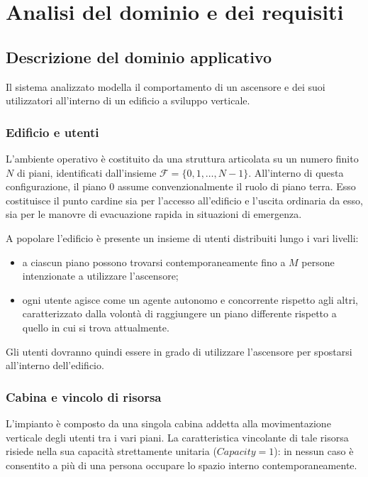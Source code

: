 \chapter{Analisi del dominio e dei requisiti}

%
%
\section{Descrizione del dominio applicativo}
Il sistema analizzato modella il comportamento di un ascensore e dei suoi utilizzatori all'interno di un edificio a sviluppo verticale.

\subsection{Edificio e utenti}
\label{subsec:building_users}
L'ambiente operativo è costituito da una struttura articolata su un numero finito $N$ di piani, identificati dall'insieme $\mathcal{F} = \{0, 1, \dots, N-1\}$.
All'interno di questa configurazione, il piano $0$ assume convenzionalmente il ruolo di piano terra.
Esso costituisce il punto cardine sia per l'accesso all'edificio e l'uscita ordinaria da esso, sia per le manovre di evacuazione rapida in situazioni di emergenza.

A popolare l'edificio è presente un insieme di utenti distribuiti lungo i vari livelli:
\begin{itemize}
  \item a ciascun piano possono trovarsi contemporaneamente fino a $M$ persone intenzionate a utilizzare l'ascensore;
  \item ogni utente agisce come un agente autonomo e concorrente rispetto agli altri, caratterizzato dalla volontà di raggiungere un piano differente rispetto a quello in cui si trova attualmente.
\end{itemize}
Gli utenti dovranno quindi essere in grado di utilizzare l'ascensore per spostarsi all'interno dell'edificio.

\subsection{Cabina e vincolo di risorsa}
L'impianto è composto da una singola cabina addetta alla movimentazione verticale degli utenti tra i vari piani.
La caratteristica vincolante di tale risorsa risiede nella sua capacità strettamente unitaria ($Capacity = 1$): in nessun caso è consentito a più di una persona occupare lo spazio interno contemporaneamente.

